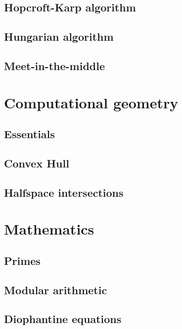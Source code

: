 \documentclass[a4paper]{article}
\newcommand{\includesnippet}[2]{

}
\begin{document}
    \subsection{Hopcroft-Karp algorithm}
    
    \subsection{Hungarian algorithm}
    
    \subsection{Meet-in-the-middle}
    
  \section{Computational geometry}
    
    \subsection{Essentials}
    \includesnippet{snippets/geometryessentials.cpp}{C++}
    
    \subsection{Convex Hull}
    
    \subsection{Halfspace intersections}
    
  \section{Mathematics}
    
    \subsection{Primes}
    
    \subsection{Modular arithmetic}
    
    \subsection{Diophantine equations}
    
\end{document}
